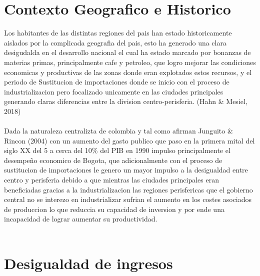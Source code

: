 \documentclass[12pt,letterpaper]{book}
\begin{document}
\section{Contexto Geografico e Historico}

\begin{flushleft}

Los habitantes de las distintas regiones del pais han estado historicamente aislados por la complicada geografia del pais, esto ha generado una clara desigudalda en el desarrollo nacional
el cual ha estado marcado por bonanzas de materias primas, principalmente cafe y petroleo, que logro mejorar las condiciones economicas y productivas de las zonas donde eran explotados estos recursos, y el periodo de
Sustitucion de importaciones donde se inicio con el proceso de industrializacion pero focalizado unicamente en las ciudades principales generando claras diferencias entre la division centro-perisferia. (Hahn \& Mesiel, 2018) \\
~\\
Dada la naturaleza centralizta de colombia y tal como afirman Junguito \& Rincon (2004) con un aumento del gasto publico que paso en la primera mital del siglo XX del 5 a cerca del 10\% del PIB en 1990 impulso
 principalmente el desempeño economico de Bogota, que adicionalmente con el proceso de sustitucion de importaciones le genero un mayor impulso a la desigualdad entre centro y perisferia debido a que
 mientras las ciudades principales eran beneficiadas gracias a la industrializacion las regiones perisfericas que el gobierno central no se interezo en industrializar sufrian el aumento en los costes asociados de produccion lo que reduccia su capacidad de inversion
 y por ende una incapacidad de lograr aumentar su productividad.\\
~\\

\end{flushleft}

\section{Desigualdad de ingresos}
\end{document}
